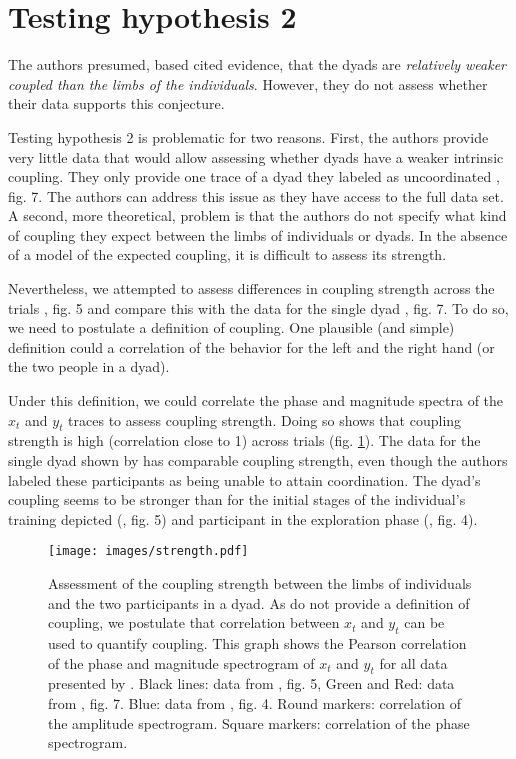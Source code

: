 \documentclass[11pt]{article}
\newcommand{\myquote}[1]{\textit{#1}}
\newcommand{\fg}[1]{\citet{Annand2020}, fig. #1}
\begin{document}
\section{Testing hypothesis 2}

The authors presumed, based cited evidence, that the dyads are \myquote{relatively weaker coupled than the limbs of the individuals}. However, they do not assess whether their data supports this conjecture. 

Testing hypothesis 2 is problematic for two reasons. First, the authors provide very little data that would allow assessing whether dyads have a weaker intrinsic coupling. They only provide one trace of a dyad they labeled as uncoordinated \fg{7}. The authors can address this issue as they have access to the full data set. A second, more theoretical, problem is that the authors do not specify what kind of coupling they expect between the limbs of individuals or dyads. In the absence of a model of the expected coupling, it is difficult to assess its strength.

Nevertheless, we attempted to assess differences in coupling strength across the trials \fg{5} and compare this with the data for the single dyad \fg{7}. To do so, we need to postulate a definition of coupling. One plausible (and simple) definition could a correlation of the behavior for the left and the right hand (or the two people in a dyad).

Under this definition, we could correlate the phase and magnitude spectra of the $x_t$ and $y_t$ traces to assess coupling strength. Doing so shows that coupling strength is high (correlation close to 1) across trials (fig. \ref{fig:strength}). The data for the single dyad shown by \citep{Annand2020} has comparable coupling strength, even though the authors labeled these participants as being unable to attain coordination. The dyad's coupling seems to be stronger than for the initial stages of the individual's training depicted (\fg{5}) and participant in the exploration phase (\fg{4}).

\begin{figure}[t]
	\centering
	\texttt{[image: images/strength.pdf]}
	\caption{Assessment of the coupling strength between the limbs of individuals and the two participants in a dyad. As \citet{Annand2020} do not provide a definition of coupling, we postulate that correlation between $x_t$ and $y_t$ can be used to quantify coupling. This graph shows the Pearson correlation of the phase and magnitude spectrogram of $x_t$ and $y_t$ for all data presented by \citet{Annand2020}. Black lines: data from \fg{5}, Green and Red: data from \fg{7}. Blue: data from \fg{4}. Round markers: correlation of the amplitude spectrogram. Square markers: correlation of the phase spectrogram.}
	\label{fig:strength}
\end{figure}
\end{document}
